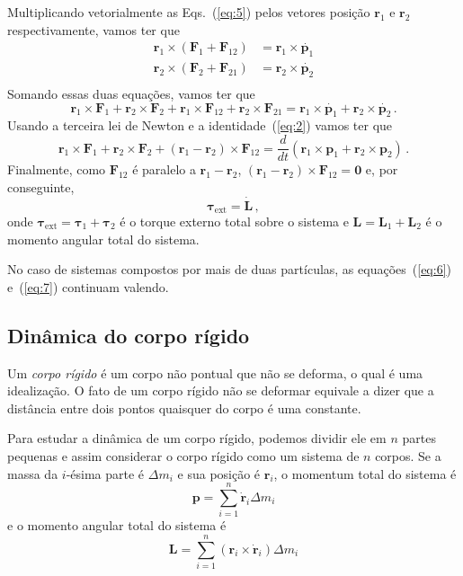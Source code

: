 \documentclass[twocolumn=on,DIV=calc]{scrartcl}
\begin{document}
Multiplicando vetorialmente as Eqs.~(\ref{eq:5}) pelos vetores posição
$\mathbf{r}_1$ e $\mathbf{r}_2$ respectivamente, vamos ter que
\begin{equation*}
  \begin{split}
    \mathbf{r}_1\times(\mathbf{F}_1+\mathbf{F}_{12})&=\mathbf{r}_1\times\dot{\mathbf{p}_1}\\
    \mathbf{r}_2\times(\mathbf{F}_2+\mathbf{F}_{21})&=\mathbf{r}_2\times\dot{\mathbf{p}_2}\\
  \end{split}
\end{equation*}
Somando essas duas equações, vamos ter que
$$\mathbf{r}_1\times\mathbf{F}_1+\mathbf{r}_2\times\mathbf{F}_2+\mathbf{r}_1\times\mathbf{F}_{12}+\mathbf{r}_2\times\mathbf{F}_{21}=\mathbf{r}_1\times\dot{\mathbf{p}_1}+\mathbf{r}_2\times\dot{\mathbf{p}_2}\,.$$
Usando a terceira lei de Newton e a identidade~(\ref{eq:2}) vamos ter
que
$$\mathbf{r}_1\times\mathbf{F}_1+\mathbf{r}_2\times\mathbf{F}_2+(\mathbf{r}_1-\mathbf{r}_2)\times\mathbf{F}_{12}=\frac{d}{dt}(\mathbf{r}_1\times\mathbf{p}_1+\mathbf{r}_2\times\mathbf{p}_2)\,.$$
Finalmente, como $\mathbf{F}_{12}$ é paralelo a
$\mathbf{r}_1-\mathbf{r}_2$,
$(\mathbf{r}_1-\mathbf{r}_2)\times\mathbf{F}_{12}=\mathbf{0}$ e, por
conseguinte,
\begin{equation}
  \label{eq:7}
  \boldsymbol{\tau}_{\mathrm{ext}}=\dot{\mathbf{L}}\,,
\end{equation}
onde
$\boldsymbol{\tau}_{\mathrm{ext}}=\boldsymbol{\tau}_1+\boldsymbol{\tau}_2$
é o torque externo total sobre o sistema e
$\mathbf{L}=\mathbf{L}_1+\mathbf{L}_2$ é o momento angular total do
sistema.

No caso de sistemas compostos por mais de duas partículas, as
equações~(\ref{eq:6}) e~(\ref{eq:7}) continuam valendo.

\subsection{Dinâmica do corpo rígido}

Um \textit{corpo rígido} é um corpo não pontual que não se deforma, o
qual é uma idealização. O fato de um corpo rígido não se deformar
equivale a dizer que a distância entre dois pontos quaisquer do corpo
é uma constante.

Para estudar a dinâmica de um corpo rígido, podemos dividir ele em $n$
partes pequenas e assim considerar o corpo rígido como um sistema de
$n$ corpos. Se a massa da $i$-ésima parte é $\Delta m_i$ e sua posição é $\mathbf{r}_i$, o momentum total do sistema é
$$\mathbf{p}=\sum_{i=1}^n\dot{\mathbf{r}}_i\Delta m_i$$
e o momento angular total do sistema é
$$\mathbf{L}=\sum_{i=1}^n(\mathbf{r}_i\times\dot{\mathbf{r}}_i)\Delta m_i$$
\end{document}
